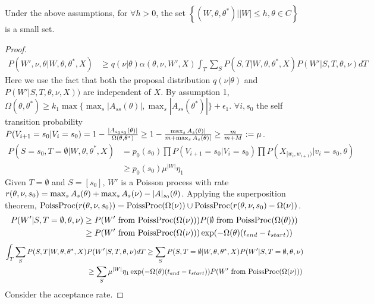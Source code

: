 \begin{theorem}
Under the above assumptions, for $\forall h > 0$, the set $\left\lbrace (W, \theta, \theta^*) | |W| \leq h, \theta \in C \right\rbrace$ is a small set.
\end{theorem}
\begin{proof}
\begin{align*}
P(W', \nu, \theta | W, \theta, \theta^*,X) &\geq q(\nu | \theta)
         \alpha(\theta, \nu, W',X) \int_T \sum_S P(S,T | W, \theta, \theta^*, X) P(W'| S, T, \theta, \nu)dT  
\end{align*}
Here we use the fact that both the proposal distribution $q(\nu|\theta)$
and $P(W'|S,T,\theta,\nu,X))$ are independent of  $X$.
By assumption 1,  $\Omega(\theta, \theta^*) \geq k_1 \max\{ 
\max_s|A_{ss}(\theta)|, \max_s|A_{ss}(\theta^*)|\} + \epsilon_1 $. 
$\forall i, s_0$ the self transition probability $P(V_{i + 1} = s_0 | 
V_i = s_0) = 1 - \frac{|A_{s_0s_0}(\theta)|}{\Omega(\theta, \theta^*)} 
\geq 1 - \frac{{\max_s A_s}(\theta)|}{m + {\max_s A_s}(\theta)|} \ge \frac{m}{m+M} := \mu$.
\begin{align*}
P(S=s_0, T = \emptyset | W, \theta, \theta^*, X) & = p_0(s_0)\prod P(V_{i + 1} = s_0 | V_i = s_0) \prod P(X_{[w_i, w_{i + 1})} | v_i = s_0, \theta)\\
& \geq p_0(s_0)\mu^{|W|}\eta_1
\end{align*}
Given $T = \emptyset$ and $S = [s_0]$, $W'$ is a Poisson process with rate 
$r(\theta, \nu, s_0) = {\max_s A_s}(\theta)+{\max_s A_s}(\nu) - |A|_{s_0}(\theta)$.
Applying the superposition theorem, $\text{PoissProc}(r(\theta, \nu, s_0)) =
\text{PoissProc}(\Omega(\nu)) \cup \text{PoissProc}(r(\theta, \nu, s_0) - \Omega(\nu))$.
\begin{align*}
P(W' | S, T = \emptyset, \theta, \nu) & \geq P(W' \from \PP(\Omega(\nu)))
P(\emptyset \from \PP(\Omega(\theta) ))\\
& \geq P(W' \from \PP(\Omega(\nu))) \exp(-\Omega(\theta)(t_{end} -
t_{start}))%
\end{align*}
\begin{align*}
  \int_T \sum_S P(S,T | W, \theta, \theta^*, X) &P(W'| S, T, \theta, \nu)dT \geq \sum_S P(S, T = \emptyset | W, \theta, \theta^*, X) P(W' | S, T=\emptyset,\theta, \nu)\\
         &\geq \sum_S \mu^{|W|}\eta_1 \exp(-{\Omega(\theta)}(t_{end} - t_{start})) 
P(W' \text{ from } \text{PoissProc}(\Omega(\nu)))
\end{align*}
Consider the acceptance rate.

\end{proof}

